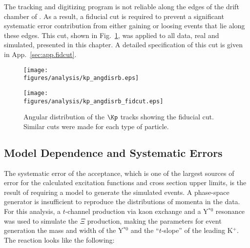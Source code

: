The tracking and digitizing program is not reliable along the edges of the drift chamber of . As a result, a fiducial cut is required to prevent a significant systematic error contribution from either gaining or loosing events that lie along these edges. This cut, shown in Fig.~\ref{fig:fidcut}, was applied to all data, real and simulated, presented in this chapter. A detailed specification of this cut is given in App.~\ref{sec:app.fidcut}.

\begin{figure}[bhtp]\centering
\begin{minipage}{0.49\linewidth}\centering
    \texttt{[image: \\figures/analysis/kp\_angdisrb.eps]}
\end{minipage}
\begin{minipage}{0.49\linewidth}\centering
    \texttt{[image: \\figures/analysis/kp\_angdisrb\_fidcut.eps]}
\end{minipage}
    \caption[Fiducial Cuts]{\label{fig:fidcut}Angular distribution of the $\Kp$ tracks showing the fiducial cut. Similar cuts were made for each type of particle.}
\end{figure}



\subsection{\label{sec:results.accept.syserr} Model Dependence and Systematic Errors}

The systematic error of the acceptance, which is one of the largest sources of error for the calculated excitation functions and cross section upper limits, is the result of requiring a model to generate the simulated events. A phase-space generator is insufficient to reproduce the distributions of momenta in the data. For this analysis, a $t$-channel production via kaon exchange and a Y$^{*0}$ resonance was used to simulate the $\Xi$ production, making the parameters for event generation the mass and width of the Y$^{*0}$ and the ``$t$-slope'' of the leading K$^+$. The reaction looks like the following:

